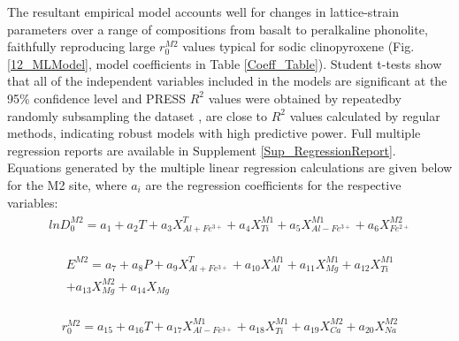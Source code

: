 \documentclass[review,authoryear,12pt]{elsarticle}
\begin{document}
	The resultant empirical model accounts well for changes in lattice-strain parameters over a range of compositions from basalt to peralkaline phonolite, faithfully reproducing large $r_0^{M2}$ values typical for sodic clinopyroxene (Fig. \ref{12_MLModel}, model coefficients in Table \ref{Coeff_Table}). Student t-tests show that all of the independent variables included in the models are significant at the 95\% confidence level and PRESS $R^2$ values were obtained by repeatedby randomly subsampling the dataset \citep{Stevens1996}, are close to $R^2$ values calculated by regular methods, indicating robust models with high predictive power. Full multiple regression reports are available in Supplement \ref{Sup_RegressionReport}. Equations generated by the multiple linear regression calculations are given below for the M2 site, where $a_i$ are the regression coefficients for the respective variables: \\
	
		\begin{align} %
	\begin{split}
   lnD^{M2}_0 = a_1 + a_2T + a_3X^{T}_{Al + Fe^{3+}} + a_4X^{M1}_{Ti} + a_5X^{M1}_{Al - Fe^{3+}} + a_6X^{M2}_{Fe^{2+}}
   	\end{split}
	\label{D0M2_eqn}
	\end{align}
	
	\begin{align} %
	\begin{split}
	E^{M2} = a_7 + a_8P + a_9X^{T}_{Al + Fe^{3+}} + a_{10}X^{M1}_{Al} + a_{11}X^{M1}_{Mg} + a_{12}X^{M1}_{Ti} \\ + a_{13}X^{M2}_{Mg} + a_{14}X_{Mg}
	\end{split}
	\label{EM2_eqn}
	\end{align}
	
	\begin{align} %
	\begin{split}
	r^{M2}_0 = a_{15} + a_{16}T + a_{17}X^{M1}_{Al - Fe^{3+}} + a_{18}X^{M1}_{Ti} + a_{19}X^{M2}_{Ca} + a_{20}X^{M2}_{Na}
	\end{split}
	\label{r0M2_eqn}
	\end{align}
	   
\end{document}
